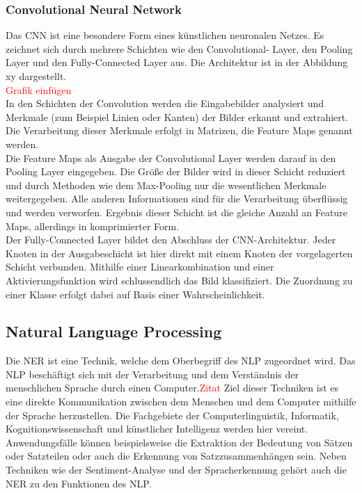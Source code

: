 \subsubsection{Convolutional Neural Network}
Das \ac{CNN} ist eine besondere Form eines künstlichen neuronalen Netzes. Es zeichnet sich durch mehrere Schichten wie den Convolutional- Layer, den Pooling Layer und den Fully-Connected Layer aus.
Die Architektur ist in der Abbildung xy dargestellt.
\\
\textcolor{red}{Grafik einfügen} \\

In den Schichten der Convolution werden die Eingabebilder analysiert und Merkmale (zum Beispiel Linien oder Kanten) der Bilder erkannt und extrahiert.
Die Verarbeitung dieser Merkmale erfolgt in Matrizen, die Feature Maps genannt werden. \\
Die Feature Maps als Ausgabe der Convolutional Layer werden darauf in den Pooling Layer eingegeben.
Die Größe der Bilder wird in dieser Schicht reduziert und durch Methoden wie dem Max-Pooling nur die wesentlichen Merkmale weitergegeben.
Alle anderen Informationen sind für die Verarbeitung überflüssig und werden verworfen. Ergebnis dieser Schicht ist die gleiche Anzahl an Feature Maps, allerdings in komprimierter Form. \\
Der Fully-Connected Layer bildet den Abschluss der \ac{CNN}-Architektur. Jeder Knoten in der Ausgabeschicht ist hier direkt mit einem Knoten der vorgelagerten Schicht verbunden.
Mithilfe einer Linearkombination und einer Aktivierungsfunktion wird schlussendlich das Bild klassifiziert. Die Zuordnung zu einer Klasse erfolgt dabei auf Basis einer Wahrscheinlichkeit.

\subsection{Natural Language Processing}
Die \acl{NER} ist eine Technik, welche dem Oberbegriff des \acl{NLP} zugeordnet wird. Das \ac{NLP} beschäftigt sich mit der Verarbeitung und dem Verständnis der menschlichen Sprache durch einen Computer.\textcolor{red}{Zitat}
Ziel dieser Techniken ist es eine direkte Kommunikation zwischen dem Menschen und dem Computer mithilfe der Sprache herzustellen. Die Fachgebiete der Computerlinguistik, Informatik, Kognitionswissenschaft und künstlicher Intelligenz werden hier vereint.
Anwendungsfälle können beispielsweise die Extraktion der Bedeutung von Sätzen oder Satzteilen oder auch die Erkennung von Satzzusammenhängen sein. Neben Techniken wie der Sentiment-Analyse und der Spracherkennung gehört auch die \acl{NER} zu den Funktionen des \ac{NLP}.

